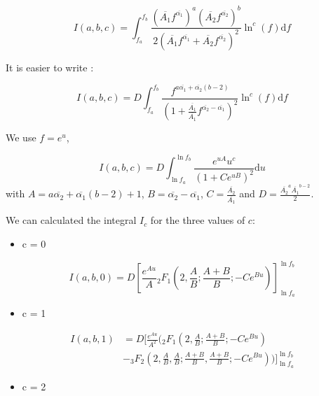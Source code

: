 \documentclass[a4paper,12pt]{article}
\begin{document}
\begin{equation}
    I(a,b,c) = \int_{f_a}^{f_b} \frac{{\left(\overline{A_1}f^{\overline{\alpha_1}}\right)}^a {\left(\overline{A_2}f^{\overline{\alpha_2}}\right)}^b}{2(\overline{A_1}f^{\overline{ \alpha_1}} +\overline{A_2}f^{\overline{ \alpha_2}})^2}  \ln^c(f) \mathrm{d}f
\end{equation}

It is easier to write : 

\begin{equation}
    I(a,b,c) = D \int_{f_a}^{f_b} \frac{f^{a \overline{ \alpha_1} + \overline{ \alpha_2}(b-2)}}{\left(1 + \frac{\overline{A_1}}{\overline{A_1}} f^{\overline{ \alpha_2} - \overline{ \alpha_1}}\right)^2} \ln^c(f) \mathrm{d}f
\end{equation}

We use $f = e^u$,

\begin{equation}
    I(a,b,c) = D \int_{\ln f_a}^{\ln f_b} \frac{e^{uA}u^c}{(1+Ce^{uB})^2} \mathrm{d}u
\end{equation}
 with $A = a \overline{ \alpha_2} + \overline{ \alpha_1}(b-2)+1 $, $B=\overline{ \alpha_2} -\overline{ \alpha_1}$, $C = \frac{\overline{A_2}}{\overline{A_1}}$ and $D = \frac{\overline{A_2}^a \overline{A_1}^{b-2}}{2}$.
 
 We can calculated the integral $I_c$ for the three values of $c$: 
 \begin{itemize}
     \item c = 0 
 \end{itemize}

        \begin{equation}
            I(a,b,0) = D \left[ \frac{e^{Au}}{A} {}_2F_1 \left(2, \frac{A}{B}; \frac{A+B}{B}; -Ce^{Bu} \right) \right]_{\ln f_a}^{\ln f_b}
        \end{equation}

 \begin{itemize}        
     \item c = 1
 \end{itemize}
 
\begin{equation}
        \begin{split}
        I(a,b,1)&= D \Bigg [ \frac{e^{Au}}{A^2} \Bigg({}_2F_1 \left(2, \frac{A}{B}; \frac{A+B}{B}; -Ce^{Bu} \right)\\[.5em]
        &- {}_3F_2 \left(2, \frac{A}{B}, \frac{A}{B}; \frac{A+B}{B}, \frac{A+B}{B}; -Ce^{Bu} \right) \Bigg) \Bigg]_{\ln f_a}^{\ln f_b}
        \end{split}
\end{equation}
\begin{itemize}
     \item c = 2 
    \end{itemize}       
          
\end{document}
